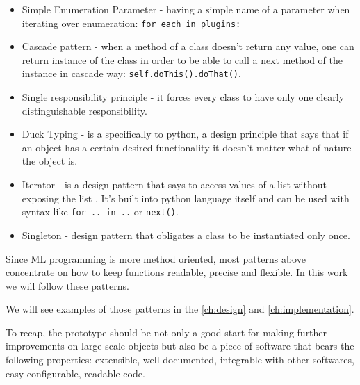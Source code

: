 \begin{itemize}
	\item Simple Enumeration Parameter - having a simple name of a parameter
		when iterating over enumeration: \lstinline{for each in plugins:} \cite{beck1997smalltalk}
	\item Cascade pattern - when a method of a class doesn't return any value,
		one can return instance of the class in order to be able to call a
		next method of the instance in cascade way: \lstinline{self.doThis().doThat()}.\cite{beck1997smalltalk}
	\item Single responsibility principle - it forces every class to have only one
		clearly distinguishable responsibility.\cite{martin2003agile}
	\item Duck Typing - is a specifically to python, a design principle that
		says that if an object has a certain desired functionality it doesn't matter
		what of nature the object is.
	\item Iterator - is a design pattern that says to access values of a list
	 	without exposing the list \cite{Gamma:1995:DPE:186897}. It's built into python language itself and
		can be used with syntax like \lstinline{for .. in ..} or \lstinline{next()}.
	\item Singleton - design pattern that obligates a class to be
		instantiated only once. \cite{Eckel2017}
\end{itemize}

Since ML programming is more method oriented, most patterns above concentrate
on how to keep functions readable, precise and flexible. In this work we will follow
these patterns.

We will see examples of those patterns in the \autoref{ch:design}
and \autoref{ch:implementation}.

To recap, the prototype should be not only a good start for making further
improvements on large scale objects but also be a piece of software that bears the
following properties: extensible, well documented, integrable with other
softwares, easy configurable, readable code.


